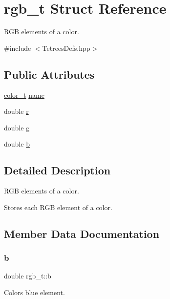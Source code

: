\hypertarget{structrgb__t}{}\section{rgb\+\_\+t Struct Reference}
\label{structrgb__t}


R\+GB elements of a color.  




{\ttfamily \#include $<$Tetrees\+Defs.\+hpp$>$}

\subsection*{Public Attributes}
\begin{DoxyCompactItemize}
\item 
\hyperlink{TetreesDefs_8hpp_a8ba5fbce2446135735693ab60c896bbd}{color\+\_\+t} \hyperlink{structrgb__t_a98fbae1e6897105536340238b9660ba5}{name}
\item 
double \hyperlink{structrgb__t_a89e46e1937cafe0683023100a5e1915a}{r}
\item 
double \hyperlink{structrgb__t_a626bf50c035e97070dcd72f3717ee64f}{g}
\item 
double \hyperlink{structrgb__t_ac93baee02597b8f626911b7ec88e5dec}{b}
\end{DoxyCompactItemize}


\subsection{Detailed Description}
R\+GB elements of a color. 

Stores each R\+GB element of a color. 

\subsection{Member Data Documentation}
\mbox{\label{structrgb__t_ac93baee02597b8f626911b7ec88e5dec}} 
\subsubsection{\texorpdfstring{b}{b}}
{\footnotesize\ttfamily double rgb\+\_\+t\+::b}

Color\textquotesingle{}s blue element. \mbox{\label{structrgb__t_a626bf50c035e97070dcd72f3717ee64f}} 
